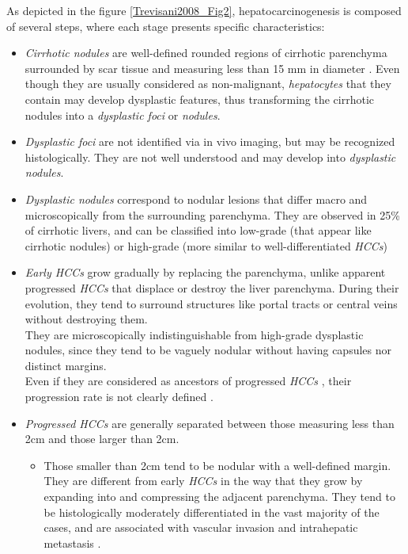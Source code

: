 \documentclass[]{article}
\begin{document}
As depicted in the figure \ref{Trevisani2008_Fig2}, hepatocarcinogenesis is composed of
several steps, where each stage presents specific characteristics:
\begin{itemize}
\item \emph{Cirrhotic nodules} are well-defined rounded regions of cirrhotic
  parenchyma surrounded by scar tissue and measuring less than 15 mm in
  diameter \cite{Zimmermann1995}. Even though they are
  usually considered as non-malignant, \emph{hepatocytes} that they
  contain may develop dysplastic features, thus transforming the
  cirrhotic nodules into a \emph{dysplastic foci} or \emph{nodules}.
\item \emph{Dysplastic foci} are not identified via in vivo imaging, but may
  be recognized histologically. They are not well understood and may
  develop into \emph{dysplastic nodules}.
\item \emph{Dysplastic nodules} correspond to nodular lesions that differ
  macro and microscopically from the surrounding parenchyma. They are
  observed in 25\% of cirrhotic livers, and can be classified into
  low-grade (that appear like cirrhotic nodules) or high-grade (more
  similar to well-differentiated \emph{HCCs})
\item \emph{Early HCCs} grow gradually by replacing the parenchyma, unlike
  apparent progressed \emph{HCCs} that displace or destroy the liver
  parenchyma. During their evolution, they tend to surround structures
  like portal tracts or central veins without destroying them.\\
  They are microscopically indistinguishable from high-grade dysplastic
  nodules, since they tend to be vaguely nodular without having capsules
  nor distinct margins.\\
  Even if they are considered as ancestors of progressed \emph{HCCs} \cite{Park2011}, their progression rate is not
  clearly defined \cite{Khalili2011}.
\item \emph{Progressed HCCs} are generally separated between those measuring
  less than 2cm and those larger than 2cm.
  \begin{itemize}
  \item Those smaller than 2cm tend to be nodular with a well-defined
    margin. They are different from early \emph{HCCs} in the way that
    they grow by expanding into and compressing the adjacent parenchyma.
    They tend to be histologically moderately differentiated in the vast
    majority of the cases, and are associated with vascular invasion and
    intrahepatic metastasis \cite{Park2011}.

\end{itemize}
\end{itemize}
\end{document}
